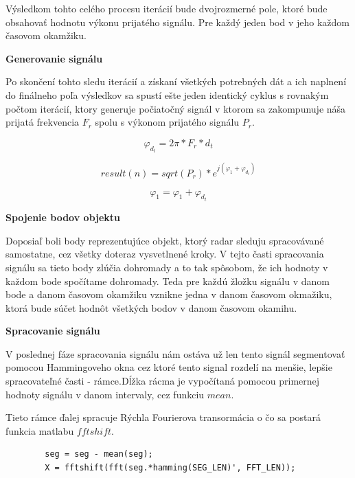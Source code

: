     Výsledkom tohto celého procesu iterácií bude dvojrozmerné pole, ktoré bude obsahovať hodnotu výkonu prijatého signálu. Pre každý jeden bod v jeho každom časovom okamžiku.\newline

    \textbf{Generovanie signálu}

    Po skončení tohto sledu iterácií a získaní všetkých potrebných dát a ich naplnení do finálneho poľa výsledkov sa spustí ešte jeden identický cyklus s rovnakým počtom iterácií, ktory generuje počiatočný signál v ktorom sa zakompunuje náša prijatá frekvencia $F_{r}$ spolu s výkonom prijatého signálu $P_{r}$.\newline  

    \begin{equation} \label{eq:631}
      \varphi_{d_{t}} = 2\pi * F_{r} * d_{t}
    \end{equation}

    \begin{equation} \label{eq:632}
      result(n) = sqrt(P_{r})*e^{j(\varphi_{1} + \varphi_{d_{t}})}
    \end{equation}

    \begin{equation} \label{eq:633}
    \varphi_{1} = \varphi_{1} +  \varphi_{d_{t}}
    \end{equation}        

    \textbf{Spojenie bodov objektu}

    Doposiaľ boli body reprezentujúce objekt, ktorý radar sleduju spracovávané samostatne, cez všetky doteraz vysvetlnené kroky.
    V tejto časti spracovania signálu sa tieto body zlúčia dohromady a to tak spôsobom, že ich hodnoty v každom bode spočítame dohromady.
    Teda pre každú žložku signálu v danom bode a danom časovom okamžiku vznikne jedna v danom časovom okmažiku, ktorá bude súčet hodnôt všetkých bodov v danom časovom okamihu.\newline

    \textbf{Spracovanie signálu}

    V poslednej fáze spracovania signálu nám ostáva už len tento signál segmentovať pomocou Hammingoveho okna cez ktoré tento signal rozdelí na menšie, lepšie spracovateľné časti - rámce.Dĺžka rácma je vypočítaná pomocou primernej hodnoty signálu v danom intervaly, cez funkciu $mean$.

    Tieto rámce ďalej spracuje Rýchla Fourierova transormácia o čo sa postará funkcia matlabu $fftshift$.

    \begin{lstlisting}
        seg = seg - mean(seg);
        X = fftshift(fft(seg.*hamming(SEG_LEN)', FFT_LEN));
    \end{lstlisting}

